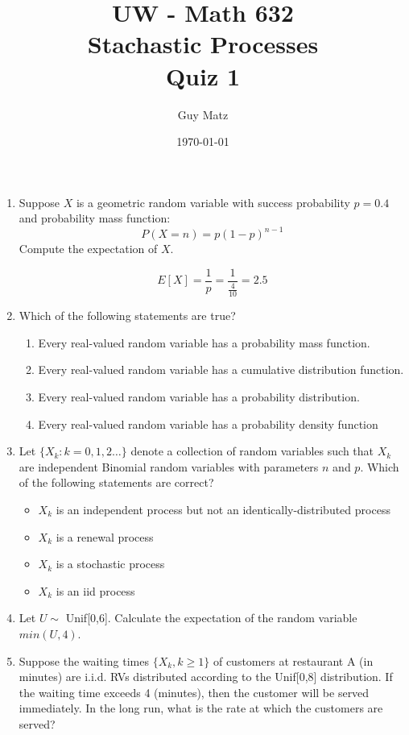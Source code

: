 \documentclass[10pt]{article}
\title{UW - Math 632 \\
Stachastic Processes \\
Quiz 1}
\author{Guy Matz}
\date{\today}
\begin{document}
\begin{enumerate}
  \item Suppose $X$ is a geometric random variable with success
    probability $p=0.4$ and probability mass function:
    \[ P(X=n)=p(1-p)^{n-1} \]
    Compute the expectation of $X$.

    \[ E[X] = \frac{1}{p} = \frac{1}{\frac{4}{10} } = 2.5   \]

\newpage

  \item Which of the following statements are true?
    \begin{enumerate}
      \item Every real-valued random variable has a probability mass function.
      \item Every real-valued random variable has a cumulative distribution function. \checkmark
      \item Every real-valued random variable has a probability distribution.
      \item Every real-valued random variable has a probability density function \checkmark
    \end{enumerate}

\newpage

  \item Let $\{ X_k : k = 0,1,2 \dots \}$ denote a collection of random
    variables such that $X_k$ are independent Binomial random variables
    with parameters $n$ and $p$.
    Which of the following statements are correct?
    \begin{itemize}
		\item $X_k$ is an independent process but not an identically-distributed process
		\item $X_k$ is a renewal process
		\item $X_k$ is a stochastic process
		\item $X_k$ is an iid process \checkmark
    \end{itemize}

\newpage

  \item Let $U \sim$ Unif[0,6]. Calculate the expectation of the random
    variable $min(U, 4)$.

\newpage

  \item Suppose the waiting times $\{X_k, k \geq 1\}$ of customers at
    restaurant A (in minutes) are i.i.d. RVs distributed according to the
    Unif[0,8] distribution. If the waiting time exceeds 4 (minutes), then
    the customer will be served immediately. In the long run, what is the
    rate at which the customers are served? 


\end{enumerate}
\end{document}

